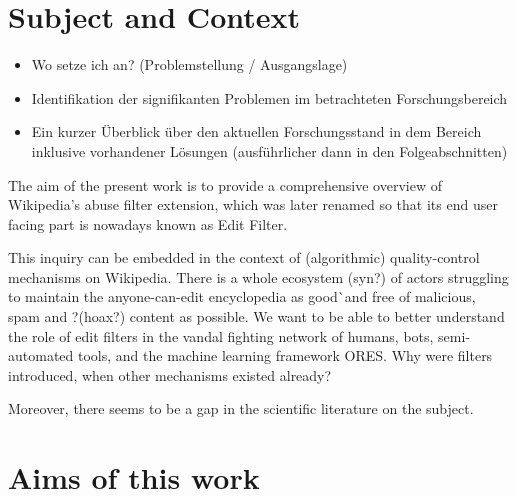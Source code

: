 \section{Subject and Context}
\begin{itemize}
	\item Wo setze ich an? (Problemstellung / Ausgangslage)
	\item Identifikation der signifikanten Problemen im betrachteten Forschungsbereich
	\item Ein kurzer Überblick über den aktuellen Forschungsstand in dem Bereich inklusive vorhandener Lösungen (ausführlicher dann in den Folgeabschnitten)
\end{itemize}

The aim of the present work is to provide a comprehensive overview of Wikipedia's abuse filter extension, which was later renamed so that its end user facing part is nowadays known as Edit Filter.


This inquiry can be embedded in the context of (algorithmic) quality-control mechanisms on Wikipedia.
There is a whole ecosystem (syn?) of actors struggling to maintain the anyone-can-edit encyclopedia as good^^ and free of malicious, spam and ?(hoax?) content as possible.
We want to be able to better understand the role of edit filters in the vandal fighting network of humans, bots, semi-automated tools, and the machine learning framework ORES.
Why were filters introduced, when other mechanisms existed already?

Moreover, there seems to be a gap in the scientific literature on the subject.

\section{Aims of this work}

